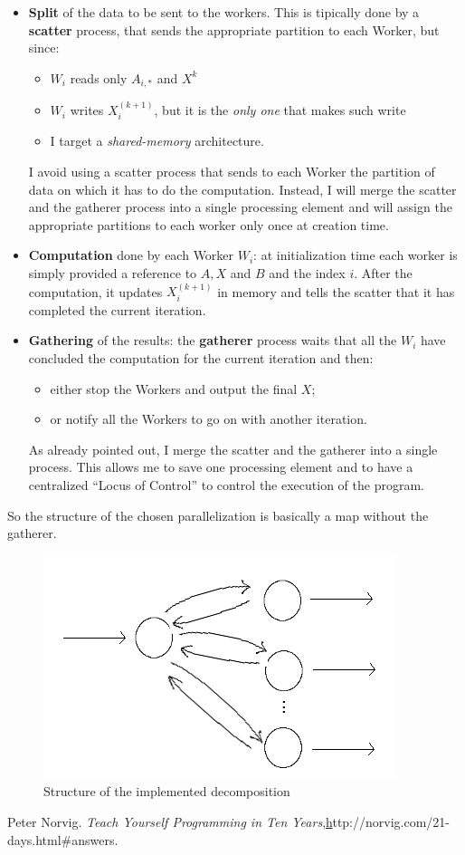 \documentclass{article}
\begin{document}
\begin{itemize}
\item \textbf{Split} of the data to be sent to the workers. This is tipically done by a \textbf{scatter} process, that sends the appropriate partition to each Worker, but since:
	\begin{itemize}
	\item $W_{i}$ reads only $A_{i,*}$ and $X^{k}$ 
	\item $W_{i}$ writes $X_{i}^{(k+1)}$, but it is the \textit{only one} that makes such write
	\item I target a \textit{shared-memory} architecture.
	\end{itemize}
I avoid using a scatter process that sends to each Worker the partition of data on which it has to do the computation. Instead, I will merge the scatter and the gatherer process into a single processing element and will assign the appropriate partitions to each worker only once at creation time.
\item \textbf{Computation} done by each Worker $W_{i}$: at initialization time each worker is simply provided a reference to $A, X$ and $B$ and the index $i$. After the computation, it updates $X_{i}^{(k+1)}$ in memory and tells the scatter that it has completed the current iteration.
\item \textbf{Gathering} of the results: the \textbf{gatherer} process waits that all the $W_{i}$ have concluded the computation for the current iteration and then:
	\begin{itemize}
	\item either stop the Workers and output the final $X$;
	\item or notify all the Workers to go on with another iteration.
	\end{itemize}
As already pointed out, I merge the scatter and the gatherer into a single process. This allows me to save one processing element and to have a centralized ``Locus of Control'' to control the execution of the program. \\
\end{itemize}
So the structure of the chosen parallelization is basically a map without the gatherer.

\begin{figure}[h]
\centering
\includegraphics[scale=0.58]{map_no_g}
\caption{Structure of the implemented decomposition}
\label{fig:worker}
\end{figure} 


\begin{thebibliography}{9}
Peter Norvig. 
\textit{Teach Yourself Programming in Ten Years},\href{ 
http://norvig.com/21-days.html\#answers}http://norvig.com/21-days.html\#answers.
\end{thebibliography} 
\end{document}
